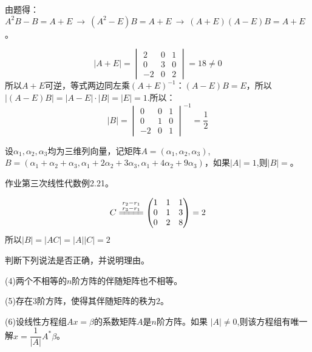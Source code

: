 \documentclass[a4paper]{report}
\begin{document}
\begin{jie}
由题得：$A^2B-B=A+E~\rightarrow~(A^2-E)B=A+E~\rightarrow~(A+E)(A-E)B=A+E$。

\begin{equation*}
|A+E|=
\begin{vmatrix}
2&0&1\\
0&3&0\\
-2&0&2
\end{vmatrix}=18\neq 0
\end{equation*}
所以$A+E$可逆，等式两边同左乘$(A+E)^{-1}$：$(A-E)B=E$，所以$|(A-E)B|=|A-E|\cdot|B|=|E|=1$.所以：
\begin{equation*}|B|=
\begin{vmatrix}
0&0&1\\
0&1&0\\
-2&0&1
\end{vmatrix}^{-1}=\frac{1}{2}
\end{equation*}
\end{jie}

\EX 设$\alpha_1,\alpha_2,\alpha_3$均为三维列向量，记矩阵$A=
(\alpha_1,\alpha_2,\alpha_3)
$,$B=(\alpha_1+\alpha_2+\alpha_3,\alpha_1+2\alpha_2+3\alpha_3,\alpha_1+4\alpha_2+9\alpha_3)$，如果$|A|=1$,则$|B|=$\underline{\hphantom{~~~~~~~~~~}}。

\begin{jie}
作业\textcolor[rgb]{1.00,0.00,0.00}{第三次线性代数}例2.21。

\begin{align*}
C\xlongequal{\substack{r_2-r_1\\ r_3-r_1}}
\begin{pmatrix}
1&1&1\\
0&1&3\\
0&2&8
\end{pmatrix}=2
\end{align*}
所以$|B|=|AC|=|A||C|=2$
\end{jie}

\EX 判断下列说法是否正确，并说明理由。

(4)两个不相等的$n$阶方阵的伴随矩阵也不相等。

(5)存在$3$阶方阵，使得其伴随矩阵的秩为$2$。

(6)设线性方程组$Ax= \beta$的系数矩阵$A$是$n$阶方阵。如果
$|A|\neq 0$,则该方程组有唯一解$x=\dfrac{1}{|A|}A^*\beta$。
\end{document}
